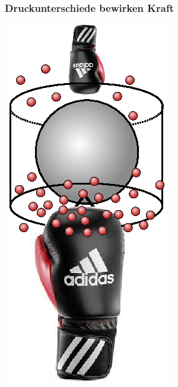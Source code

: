 \documentclass{beamer}
\begin{document}
\begin{frame}
\frametitle{Druckunterschiede bewirken Kraft}
\begin{center}
    \includegraphics[scale=0.8]{inkscape/dichte2}
    
\end{center}
\end{frame}
\end{document}
